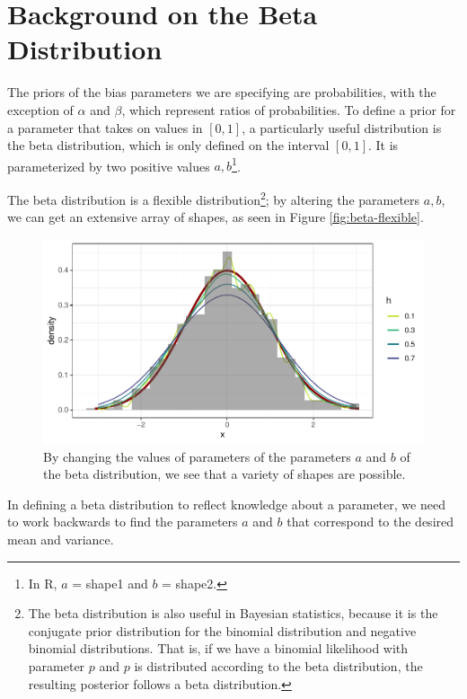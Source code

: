 \documentclass[12pt,twoside]{smiththesis}
\begin{document}
\hypertarget{background-on-the-beta-distribution}{%
\section{Background on the Beta Distribution}\label{background-on-the-beta-distribution}}

The priors of the bias parameters we are specifying are probabilities, with the exception of \(\alpha\) and \(\beta\), which represent ratios of probabilities. To define a prior for a parameter that takes on values in \([0,1]\), a particularly useful distribution is the beta distribution, which is only defined on the interval \([0,1]\). It is parameterized by two positive values \(a, b\)\footnote{In R, \(a\) = shape1 and \(b\) = shape2.}.

The beta distribution is a flexible distribution\footnote{The beta distribution is also useful in Bayesian statistics, because it is the conjugate prior distribution for the binomial distribution and negative binomial distributions. That is, if we have a binomial likelihood with parameter \(p\) and \(p\) is distributed according to the beta distribution, the resulting posterior follows a beta distribution.}; by altering the parameters \(a,b\), we can get an extensive array of shapes, as seen in Figure \ref{fig:beta-flexible}.
\begin{figure}

{\centering \includegraphics[width=0.9\linewidth]{thesis_files/figure-latex/unnamed-chunk-36-1} 

}

\caption{\label{fig:beta-flexible}By changing the values of parameters of the parameters $a$ and $b$ of the beta distribution, we see that a variety of shapes are possible.}\label{fig:unnamed-chunk-36}
\end{figure}
In defining a beta distribution to reflect knowledge about a parameter, we need to work backwards to find the parameters \(a\) and \(b\) that correspond to the desired mean and variance.
\end{document}
